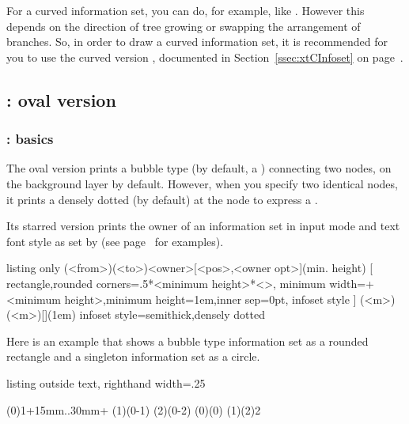 For a curved information set, you can do, for example, like .
However this depends on the direction of tree growing or swapping the arrangement of branches.
So, in order to draw a curved information set, it is recommended for you to use the curved version \cmd{\xtCInfoset}, documented in Section~\ref{ssec:xtCInfoset} on page~\pageref{ssec:xtCInfoset}.

\subsection{\protect\cmd{\xtInfosetO}: oval version}

\subsubsection{\protect\cmd{\xtInfosetO}: basics}
\label{ssec:xtInfosetO}

The oval version \icmd{\xtInfosetO} prints a bubble type (by default, a )  connecting two nodes, on the background layer by default.
However, when you specify two identical nodes, it prints a densely dotted  (by default) at the node to express a \emph{}.

Its starred version \icmd{\xtInfosetO*} prints the owner of an information set in input mode and text font style as set by \cmd{\setistmathTF(*)} (see page~\pageref{page:xtInfoset*} for examples).

\begin{tcblisting}{listing only}
  (<from>)(<to>){<owner>}[<pos>,<owner opt>](min. height)
  [ rectangle,rounded corners=.5*<minimum height>*<\xtscale>,
    minimum width=+<minimum height>,minimum height=1em,inner sep=0pt,
    infoset style ]
  (<m>)(<m>){}[](1em)
  infoset style={semithick,densely dotted}
\end{tcblisting}

Here is an example that shows a bubble type information set as a rounded rectangle and a singleton information set as a circle.

\begin{tcblisting}{listing outside text, righthand width=.25\linewidth}
\begin{istgame}
\istroot(0){1}+15mm..30mm+
    \endist
\istroot(1)(0-1)      \endist
\istroot(2)(0-2)    \endist
\xtInfosetO(0)(0)
\xtInfosetO(1)(2){2}
\end{istgame}
\end{tcblisting}

